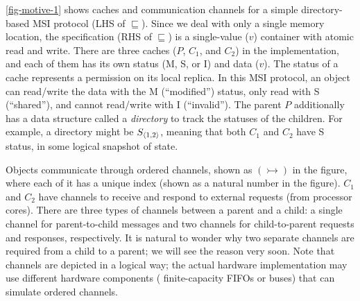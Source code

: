 \autoref{fig-motive-1} shows caches and communication channels for a simple directory-based MSI protocol (LHS of $\sqsubseteq$).
Since we deal with only a single memory location, the specification (RHS of $\sqsubseteq$) is a single-value ($v$) container with atomic read and write.
There are three caches ($P$, $C_1$, and $C_2$) in the implementation, and each of them has its own status (M, S, or I) and data ($v$).
The status of a cache represents a permission on its local replica.
In this MSI protocol, an object can read/write the data with the M (``modified'') status, only read with S (``shared''), and cannot read/write with I (``invalid'').
The parent $P$ additionally has a data structure called a \emph{directory} to track the statuses of the children.
For example, a directory might be $S_{\langle 1, 2 \rangle}$, meaning that both $C_1$ and $C_2$ have S status, in some logical snapshot of state.

Objects communicate through ordered channels, shown as $(\rightarrowtail)$ in the figure, where each of it has a unique index (shown as a natural number in the figure).
$C_1$ and $C_2$ have channels to receive and respond to external requests (from processor cores).
There are three types of channels between a parent and a child: a single channel for parent-to-child messages and two channels for child-to-parent requests and responses, respectively.
It is natural to wonder why two separate channels are required from a child to a parent; we will see the reason very soon.
Note that channels are depicted in a logical way; the actual hardware implementation may use different hardware components (\eg{} finite-capacity FIFOs or buses) that can simulate ordered channels.

